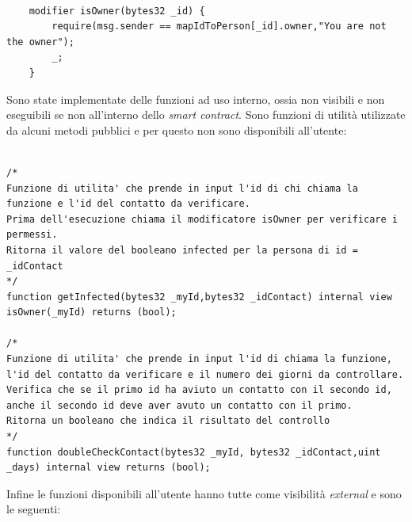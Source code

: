 \mbox{\newline}
\begin{lstlisting}[language = Solidity]

    modifier isOwner(bytes32 _id) { 
        require(msg.sender == mapIdToPerson[_id].owner,"You are not the owner");
        _; 
    }

\end{lstlisting}
\mbox{\newline}

Sono state implementate delle funzioni ad uso interno, ossia non visibili e non eseguibili se non all'interno dello \textit{smart contract}.
Sono funzioni di utilità utilizzate da alcuni metodi pubblici e per questo non sono disponibili all'utente:

\mbox{\newline}
\begin{lstlisting}[language = Solidity]

/*
Funzione di utilita' che prende in input l'id di chi chiama la funzione e l'id del contatto da verificare.
Prima dell'esecuzione chiama il modificatore isOwner per verificare i permessi.
Ritorna il valore del booleano infected per la persona di id = _idContact
*/
function getInfected(bytes32 _myId,bytes32 _idContact) internal view isOwner(_myId) returns (bool);

/*
Funzione di utilita' che prende in input l'id di chiama la funzione, l'id del contatto da verificare e il numero dei giorni da controllare.
Verifica che se il primo id ha aviuto un contatto con il secondo id, anche il secondo id deve aver avuto un contatto con il primo.
Ritorna un booleano che indica il risultato del controllo
*/
function doubleCheckContact(bytes32 _myId, bytes32 _idContact,uint _days) internal view returns (bool);

\end{lstlisting}
\mbox{\newline}

Infine le funzioni disponibili all'utente hanno tutte come visibilità \textit{external} e sono le seguenti:

